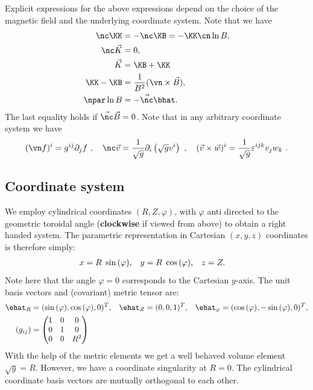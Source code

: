 Explicit expressions for the above expressions
depend on the choice of the magnetic field and the underlying coordinate system.
Note that we have
\begin{align}
    \nc \KK
&= -\nc \KB = -\KK\cn\ln B, \\
    \nc\vec{ K} &= 0, \\
    \vec K &= \KB + \KK \\
    \KK - \KB &= \frac{1}{B^2} (\vn \times \vec B), \\
    \npar \ln B &= -\vec\nc\bhat.
    \label{eq:curl_curvature}
\end{align}
The last equality holds if $\vec\nc \vec B = 0$.
Note that in any arbitrary coordinate system we have
\begin{align}
(\vn f)^i = g^{ij}\partial_j f ~, \quad
\nc \vec v = \frac{1}{\sqrt{g}}\partial_i \left(\sqrt{g} v^i\right) ~, \quad
(\vec v \times \vec w)^i = \frac{1}{\sqrt{g}}\varepsilon^{ijk} v_jw_k ~.
\end{align}

\subsection{Coordinate system}\label{sec:cylmetric}
We employ cylindrical coordinates \( (R,Z,\varphi) \), with \(\varphi\) anti directed to the geometric toroidal angle ({\bf clockwise} if viewed from above) to
obtain a right handed system. The parametric representation in Cartesian \((x,y,z)\) coordinates is therefore simply:
\begin{align}
 x &= R \hspace{1 mm} \sin{(\varphi)}, &
 y &= R \hspace{1 mm} \cos{(\varphi)}, &
 z &= Z .
\end{align}
Note here that the angle $\varphi = 0$ corresponds to the Cartesian $y$-axis.
The unit
basis vectors and (covariant) metric tensor are:
\begin{align}
 \ehat_R      &= (\sin{(\varphi)} ,   \cos{(\varphi)},0)^T, &
 \ehat_Z      &= ( 0 ,0 ,1 )^T, &
 \ehat_{\varphi} &= ( \cos{(\varphi)} , -\sin{(\varphi)} , 0 )^T,
\\
    (g_{ij}) &= \begin{pmatrix}
  1 & 0 & 0 \\
  0 & 1 & 0 \\
  0 & 0 & R^2
   \end{pmatrix}
\end{align}
With the help of the metric elements we get a well behaved volume element \(\sqrt{g} = R\). However, we have a coordinate singularity at \(R=0\).
The cylindrical coordinate basis vectors are mutually orthogonal to each other.

